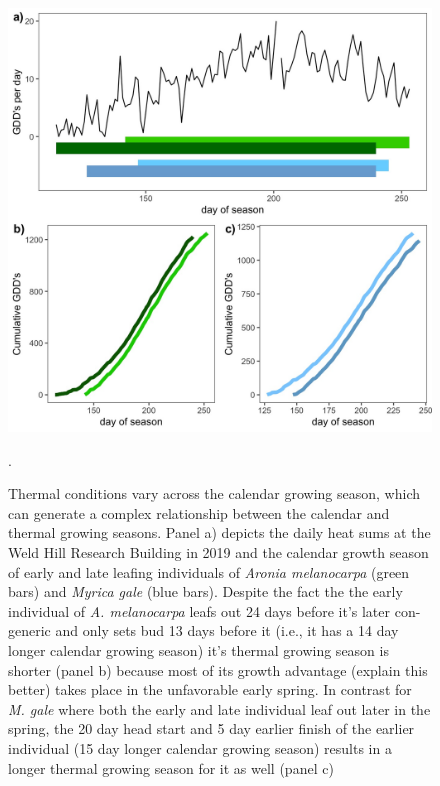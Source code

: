 \documentclass{article}[12pt]
\begin{document}
{%
 \newpage
 \begin{figure}[h!]
    \centering
 \includegraphics[width=.8\textwidth]{..//analyses/figures/aronia_examp.jpeg}
    \caption{Thermal conditions vary across the calendar growing season, which can generate a complex relationship between the calendar and thermal growing seasons. Panel a) depicts the daily heat sums at the Weld Hill Research Building in 2019 and the calendar growth season of early and late leafing individuals of \emph{Aronia melanocarpa} (green bars) and \emph{Myrica gale} (blue bars). Despite the fact the the early individual of \emph{A. melanocarpa} leafs out 24 days before it's later con-generic and only sets bud 13 days before it (i.e., it has a 14 day longer calendar growing season) it's thermal growing season is shorter (panel b) because most of its growth advantage (explain this better) takes place in the unfavorable early spring. In contrast for \emph{M. gale} where both the early and late individual leaf out later in the spring, the 20 day head start and 5 day earlier finish of the earlier individual (15 day longer calendar growing season) results in a longer thermal growing season for it as well (panel c)}.
    \label{fig:concept}
\end{figure}

}
\end{document}
